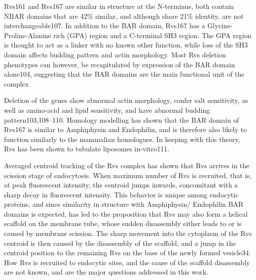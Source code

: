 		
	\vspace{5mm}
	Rvs161 and Rvs167 are similar in structure at the N-terminus, both contain NBAR domains that are 42\% similar, and although share 21\% identity, are not interchangeable107. In addition to the BAR domain, Rvs167 has a Glycine-Proline-Alanine rich (GPA) region and a C-terminal SH3 region. The GPA region is thought to act as a linker with no known other function, while loss of the SH3 domain affects budding pattern and actin morphology. Most Rvs deletion phenotypes can however, be recapitulated by expression of the BAR domain alone104, suggesting that the BAR domains are the main functional unit of the complex 

	\vspace{5mm}
	Deletion of the genes show abnormal actin morphology, confer salt sensitivity, as well as amino-acid and lipid sensitivity, and have abnormal budding pattern103,108–110. Homology modelling has shown that the BAR domain of Rvs167 is similar to Amphiphysin and Endophilin, and is therefore also likely to function similarly to the mammalian homologues. In keeping with this theory, Rvs has been shown to tubulate liposomes in-vitro111. 

		
	\vspace{5mm}
	Averaged centroid tracking of the Rvs complex has shown that Rvs arrives in the scission stage of endocytosis. When maximum number of Rvs is recruited, that is, at peak fluorescent intensity, the centroid jumps inwards, concomitant with a sharp decay in fluorescent intensity. This behavior is unique among endocytic proteins, and since similarity in structure with Amphiphysin/ Endophilin BAR domains is expected, has led to the proposition that Rvs may also form a helical scaffold on the membrane tube, whose sudden disassembly either leads to or is caused by membrane scission. The sharp movement into the cytoplasm of the Rvs centroid is then caused by the disassembly of the scaffold, and a jump in the centroid position to the remaining Rvs on the base of the newly formed vesicle34. How Rvs is recruited to endocytic sites, and the cause of the scaffold disassembly are not known, and are the major questions addressed in this work.


		

